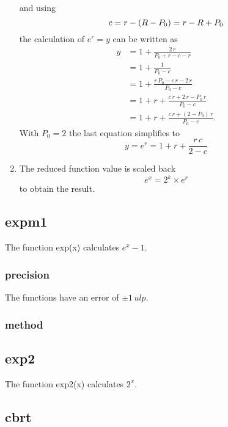 \documentclass[12pt]{article}
\numberwithin{equation}{subsection}
\begin{document}
\begin{enumerate}
    and using
    \begin{equation}
        c = r - (R-P_0) = r - R + P_0 \\
    \end{equation}
    the calculation of $e^r=y$ can be written as
    \[
        \begin{aligned}
            y &= 1 + \frac{2\,r}{P_0+r-c-r} \\
              &= 1 + \frac{1}{P_0-c} \\
              &= 1 + \frac{r\,P_0 - c\,r -2\,r}{P_0-c} \\
              &= 1 + r + \frac{c\,r+2\,r-P_0\,r}{P_0-c} \\
              &= 1 + r + \frac{c\,r+(2-P_0)\,r}{P_0-c}.
         \end{aligned}
    \]
    With $P_0 = 2$ the last equation simplifies to
    \begin{equation}
        y= e^r= 1 + r + \frac{r\,c}{2-c}
    \end{equation}

\item The reduced function value is scaled back
    \begin{equation}
        e^x = 2^k \times e^r
    \end{equation}
    to obtain the result.

\end{enumerate}


\subsection{expm1}
\label{sub_sec:expm1}
The function exp(x) calculates $ e^x-1 $.

\subsubsection{precision}
The functions have an error of $ \pm 1\, ulp$.

\subsubsection{method}


\subsection{exp2}
The function exp2(x) calculates $ 2^x $.

\subsection{cbrt}
\end{document}
